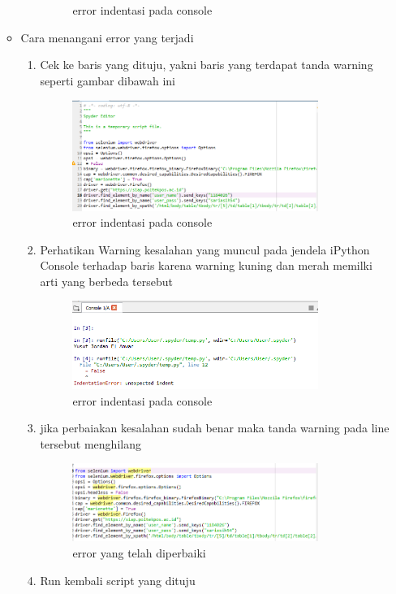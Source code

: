 \begin{enumerate}
\begin{itemize}
\begin{enumerate}
\begin{figure}[H]
			\centering
			\caption{error indentasi pada console}
			\end{figure}
	\end{enumerate}
	\item Cara menangani error yang terjadi
	\begin{enumerate}
		\item Cek ke baris yang dituju, yakni baris yang terdapat tanda warning seperti gambar dibawah ini
			\begin{figure}[H]
			\includegraphics[width=8cm]{figures/1184026/eror/1.png}
			\centering
			\caption{error indentasi pada console}
			\end{figure}
		\item Perhatikan Warning kesalahan yang muncul pada jendela iPython Console terhadap baris karena warning kuning dan merah memilki arti yang berbeda tersebut
			\begin{figure}[H]
			\includegraphics[width=8cm]{figures/1184026/eror/2.png}
			\centering
			\caption{error indentasi pada console}
			\end{figure}
		\item jika perbaiakan kesalahan sudah benar maka  tanda warning pada line tersebut menghilang
			\begin{figure}[H]
			\includegraphics[width=8cm]{figures/1184026/eror/20.png}
			\centering
			\caption{error yang telah diperbaiki}
			\end{figure}
		\item Run kembali script yang dituju
	\end{enumerate}
\end{itemize}
\end{enumerate}